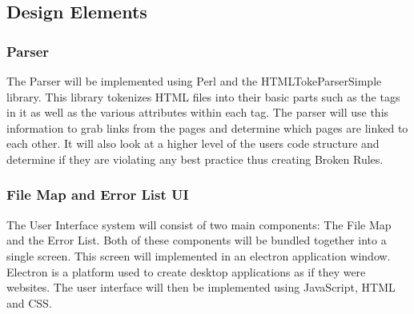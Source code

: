 \documentclass[letterpaper,10pt,titlepage,draftclsnofoot,onecolumn,onesided] {IEEEtran}
\begin{document}
\subsection{Design Elements}


	\subsubsection{Parser}
	The Parser will be implemented using Perl and the HTMLTokeParserSimple library.
	This library tokenizes HTML files into their basic parts such as the tags in it as well as the various attributes within each tag.
	The parser will use this information to grab links from the pages and determine which pages are linked to each other.
	It will also look at a higher level of the users code structure and determine if they are violating any best practice thus creating Broken Rules. 

	\subsubsection{File Map and Error List UI}
	The User Interface system will consist of two main components: The File Map and the Error List. 
	Both of these components will be bundled together into a single screen. 
	This screen will implemented in an electron application window. 
	Electron is a platform used to create desktop applications as if they were websites.
	The user interface will then be implemented using JavaScript, HTML and CSS.
	
\end{document}
